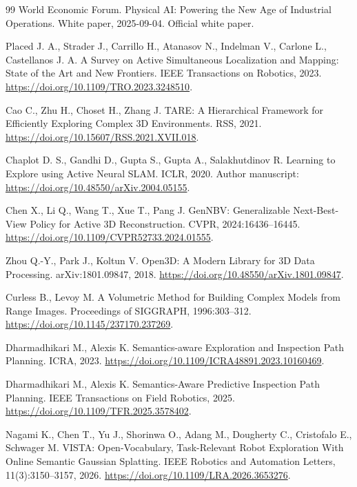 \documentclass[11pt,a4paper]{article}
\providecommand{\href}[2]{#2}
\begin{document}
\begin{thebibliography}{99}
 World Economic Forum. Physical AI: Powering the New Age of Industrial Operations. White paper, 2025-09-04. \href{https://www.weforum.org/publications/physical-ai-powering-the-new-age-of-industrial-operations/}{Official white paper}.

 Placed J. A., Strader J., Carrillo H., Atanasov N., Indelman V., Carlone L., Castellanos J. A. A Survey on Active Simultaneous Localization and Mapping: State of the Art and New Frontiers. IEEE Transactions on Robotics, 2023. \url{https://doi.org/10.1109/TRO.2023.3248510}.

 Cao C., Zhu H., Choset H., Zhang J. TARE: A Hierarchical Framework for Efficiently Exploring Complex 3D Environments. RSS, 2021. \url{https://doi.org/10.15607/RSS.2021.XVII.018}.

 Chaplot D. S., Gandhi D., Gupta S., Gupta A., Salakhutdinov R. Learning to Explore using Active Neural SLAM. ICLR, 2020. Author manuscript: \url{https://doi.org/10.48550/arXiv.2004.05155}.

 Chen X., Li Q., Wang T., Xue T., Pang J. GenNBV: Generalizable Next-Best-View Policy for Active 3D Reconstruction. CVPR, 2024:16436--16445. \url{https://doi.org/10.1109/CVPR52733.2024.01555}.

 Zhou Q.-Y., Park J., Koltun V. Open3D: A Modern Library for 3D Data Processing. arXiv:1801.09847, 2018. \url{https://doi.org/10.48550/arXiv.1801.09847}.

 Curless B., Levoy M. A Volumetric Method for Building Complex Models from Range Images. Proceedings of SIGGRAPH, 1996:303--312. \url{https://doi.org/10.1145/237170.237269}.

 Dharmadhikari M., Alexis K. Semantics-aware Exploration and Inspection Path Planning. ICRA, 2023. \url{https://doi.org/10.1109/ICRA48891.2023.10160469}.

 Dharmadhikari M., Alexis K. Semantics-Aware Predictive Inspection Path Planning. IEEE Transactions on Field Robotics, 2025. \url{https://doi.org/10.1109/TFR.2025.3578402}.

 Nagami K., Chen T., Yu J., Shorinwa O., Adang M., Dougherty C., Cristofalo E., Schwager M. VISTA: Open-Vocabulary, Task-Relevant Robot Exploration With Online Semantic Gaussian Splatting. IEEE Robotics and Automation Letters, 11(3):3150--3157, 2026. \url{https://doi.org/10.1109/LRA.2026.3653276}.


\end{thebibliography}
\end{document}
